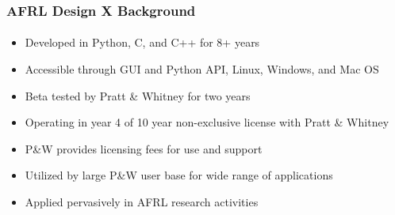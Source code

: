 \documentclass[t]{beamer}
\begin{document}
\begin{frame}
  \frametitle{AFRL Design X Background}
  \framesubtitle{}

  \begin{itemize}
  \item Developed in Python, C, and C++ for 8+ years
  \item Accessible through GUI and Python API, Linux, Windows, and Mac OS
  \item Beta tested by Pratt \& Whitney for two years
  \item Operating in year 4 of 10 year non-exclusive license with Pratt \& Whitney
  \item P\&W provides licensing fees for use and support
  \item Utilized by large P\&W user base for wide range of applications
  \item Applied pervasively in AFRL research activities
  \end{itemize}

\end{frame}






\end{document}
